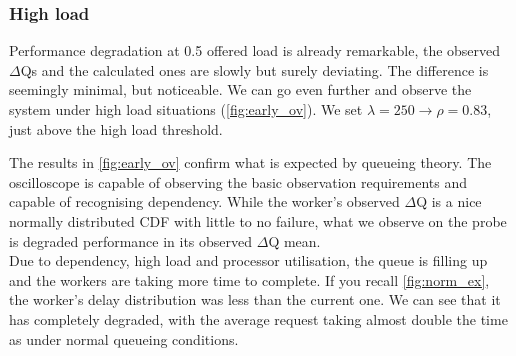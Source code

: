 \subsubsection{High load}
    Performance degradation at 0.5 offered load is already remarkable, the observed $\Delta$Qs and the calculated ones are slowly but surely deviating. The difference is seemingly minimal, but noticeable. We can go even further and observe the system under high load situations (\cref{fig:early_ov}). We set $\lambda = 250 \rightarrow \rho = 0.83$, just above the high load threshold.
    
    The results in \cref{fig:early_ov} confirm what is expected by queueing theory. The oscilloscope is capable of observing the basic observation requirements and capable of recognising dependency. While the worker's observed $\Delta$Q is a nice normally distributed CDF with little to no failure, what we observe on the probe is degraded performance in its observed $\Delta$Q mean. \\
    Due to dependency, high load and processor utilisation, the queue is filling up and the workers are taking more time to complete. If you recall \cref{fig:norm_ex}, the worker's delay distribution was less than the current one. We can see that it has completely degraded, with the average request taking almost double the time as under normal queueing conditions. 

